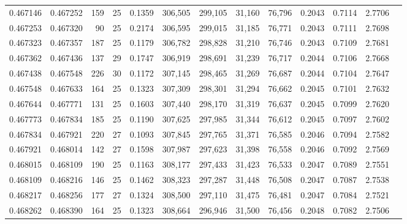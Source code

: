 \begin{tabular}{rrrrrrrrrrrrr}
0.467146 & 0.467252 & 159 &  25 &                                     0.1359 & 306,505 & 299,105 &  31,160 &  76,796 & 0.2043 & 0.7114 & 2.7706 \\
0.467253 & 0.467320 &  90 &  25 &                                     0.2174 & 306,595 & 299,015 &  31,185 &  76,771 & 0.2043 & 0.7111 & 2.7698 \\
0.467323 & 0.467357 & 187 &  25 &                                     0.1179 & 306,782 & 298,828 &  31,210 &  76,746 & 0.2043 & 0.7109 & 2.7681 \\
0.467362 & 0.467436 & 137 &  29 &                                     0.1747 & 306,919 & 298,691 &  31,239 &  76,717 & 0.2044 & 0.7106 & 2.7668 \\
0.467438 & 0.467548 & 226 &  30 &                                     0.1172 & 307,145 & 298,465 &  31,269 &  76,687 & 0.2044 & 0.7104 & 2.7647 \\
0.467548 & 0.467633 & 164 &  25 &                                     0.1323 & 307,309 & 298,301 &  31,294 &  76,662 & 0.2045 & 0.7101 & 2.7632 \\
0.467644 & 0.467771 & 131 &  25 &                                     0.1603 & 307,440 & 298,170 &  31,319 &  76,637 & 0.2045 & 0.7099 & 2.7620 \\
0.467773 & 0.467834 & 185 &  25 &                                     0.1190 & 307,625 & 297,985 &  31,344 &  76,612 & 0.2045 & 0.7097 & 2.7602 \\
0.467834 & 0.467921 & 220 &  27 &                                     0.1093 & 307,845 & 297,765 &  31,371 &  76,585 & 0.2046 & 0.7094 & 2.7582 \\
0.467921 & 0.468014 & 142 &  27 &                                     0.1598 & 307,987 & 297,623 &  31,398 &  76,558 & 0.2046 & 0.7092 & 2.7569 \\
0.468015 & 0.468109 & 190 &  25 &                                     0.1163 & 308,177 & 297,433 &  31,423 &  76,533 & 0.2047 & 0.7089 & 2.7551 \\
0.468109 & 0.468216 & 146 &  25 &                                     0.1462 & 308,323 & 297,287 &  31,448 &  76,508 & 0.2047 & 0.7087 & 2.7538 \\
0.468217 & 0.468256 & 177 &  27 &                                     0.1324 & 308,500 & 297,110 &  31,475 &  76,481 & 0.2047 & 0.7084 & 2.7521 \\
0.468262 & 0.468390 & 164 &  25 &                                     0.1323 & 308,664 & 296,946 &  31,500 &  76,456 & 0.2048 & 0.7082 & 2.7506 \\

\end{tabular}

